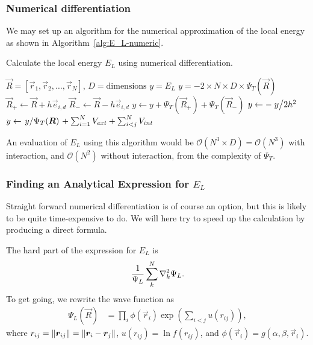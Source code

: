 \documentclass[twocolumn]{article}
\begin{document}
\subsubsection{Numerical differentiation}
We may set up an algorithm for the numerical approximation of the local energy
as shown in Algorithm~\ref{alg:E_L-numeric}.
\begin{algorithm}[H]
    \caption{Calculate the local energy $E_L$ using numerical differentiation.}
    \label{alg:E_L-numeric}
    \begin{algorithmic}[1]
        \REQUIRE $\vec R = [\vec r_1,\vec r_2,\dots,\vec r_N]$, $D=\text{dimensions}$
        \ENSURE $y = E_L$
        \STATE $y = -2\times N\times D\times  \Psi_T(\vec R)$
                \STATE $\vec R_+\leftarrow \vec R + h \vec e_{i, d}$
                \STATE $\vec R_-\leftarrow \vec R - h \vec e_{i, d}$
                \STATE $y\leftarrow y + \Psi_T(\vec R_+) + \Psi_T(\vec R_-)$
            \ENDFOR
        \ENDFOR
        \STATE $y\leftarrow -\flatfrac{y}{2h^2}$
        \STATE $y\leftarrow \flatfrac{y}{\Psi_T(\vec R)}+\sum_{i=1}^N V_{ext} + \sum_{i<j}^N V_{int} $
    \end{algorithmic}
\end{algorithm}
An evaluation of $E_L$ using this algorithm would be $\mathcal{O}(N^3\times
D)=\mathcal{O}(N^3)$ with interaction, and $\mathcal{O}(N^2)$ without interaction, from
the complexity of $\Psi_T$.



\subsubsection{Finding an Analytical Expression for $E_L$}
Straight forward numerical differentiation is of course an
option, but this is likely to be quite time-expensive to do. We will here try to
speed up the calculation by producing a direct formula.

The hard part of the expression for $E_L$ is
\begin{align}
    \frac{1}{\Psi_L}\sum_{k}^N\laplacian_k{\Psi_L}.
\end{align}
To get going, we rewrite the wave function as
\begin{align}
    \Psi_L(\vec R) &= \prod_i \phi(\vec r_i)\exp(\sum_{i<j}u(r_{ij})),
\end{align}
where $r_{ij} = \norm{\bm r_{ij}} = \norm{\bm r_i - \bm r_j}$, $u(r_{ij}) =
\ln f(r_{ij})$, and $\phi(\vec r_i)=g(\alpha,\beta,\vec r_i)$.
\end{document}
